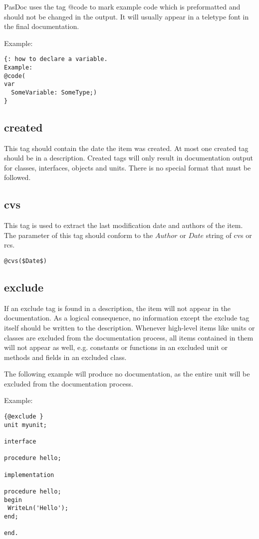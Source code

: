 \documentclass[11pt]{article}
\begin{document}
PasDoc uses the tag @code to mark example code which is preformatted and should 
not be changed in the output. It will usually appear in a teletype font in
the final documentation.

Example:
\begin{verbatim}
{: how to declare a variable.
Example:
@code(
var
  SomeVariable: SomeType;)
}
\end{verbatim}


\subsection{created}

This tag should contain the date the item was created.
At most one created tag should be in a description.
Created tags will only result in documentation output for
classes, interfaces, objects and units.
There is no special format that must be followed.

\subsection{cvs}

This tag is used to extract the last modification
date and authors of the item. The parameter of this
tag should conform to the $Author$ or $Date$ string
of cvs or rcs.

\begin{verbatim}
@cvs($Date$)
\end{verbatim}

\subsection{exclude}

If an exclude tag is found in a description, the item will not
appear in the documentation.
As a logical consequence, no information except the
exclude tag itself should be written to the description.
Whenever high-level items like units or classes are excluded from the
documentation process, all items contained in them will not appear as well,
e.g. constants or functions in an excluded unit or methods and fields in
an excluded class.

The following example will produce no documentation, as the entire unit
will be excluded from the documentation process.

Example:
\begin{verbatim}
{@exclude }
unit myunit;

interface

procedure hello;

implementation

procedure hello;
begin
 WriteLn('Hello');
end;

end.
\end{verbatim}
\end{document}
